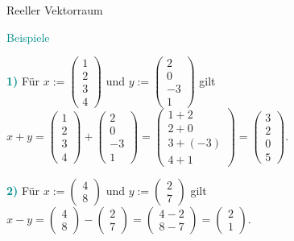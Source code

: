 \documentclass[
  8pt,
  ignorenonframetext,
]{beamer}
\begin{document}
\begin{frame}{Reeller Vektorraum}
\protect\hypertarget{reeller-vektorraum-3}{}
\vspace{3mm}

\textcolor{darkcyan}{Beispiele}

\footnotesize

\textbf{\textcolor{darkcyan}{1)}} Für
\(x:= \begin{pmatrix}1\\2\\3\\4\end{pmatrix}\) und
\(y:= \begin{pmatrix}2\\0\\-3\\1\end{pmatrix}\) gilt
\(x+y = \begin{pmatrix}1\\2\\3\\4\end{pmatrix} + \begin{pmatrix}2\\0\\-3\\1\end{pmatrix} = \begin{pmatrix}1+2\\2+0\\3+(-3)\\4+1\end{pmatrix}=\begin{pmatrix}3\\2\\0\\5\end{pmatrix}\).

\vspace{6pt}

\textbf{\textcolor{darkcyan}{2)}} Für
\(x:= \begin{pmatrix}4\\8\end{pmatrix}\) und
\(y:= \begin{pmatrix}2\\7\end{pmatrix}\) gilt
\(x-y = \begin{pmatrix}4\\8\end{pmatrix} - \begin{pmatrix}2\\7\end{pmatrix} = \begin{pmatrix}4-2\\8-7\end{pmatrix} = \begin{pmatrix}2\\1\end{pmatrix}\).


\end{frame}
\end{document}
